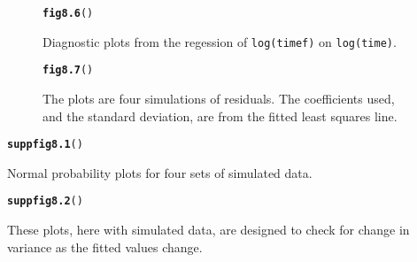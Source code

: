 \documentclass[12pt, a4paper,  BCOR=8.25mm, DIV=15]{scrartcl}\usepackage[]{graphicx}\usepackage[]{color}
\makeatletter
\newcommand{\hlstd}[1]{\textcolor[rgb]{0.345,0.345,0.345}{#1}}%
\newcommand{\hlkwd}[1]{\textcolor[rgb]{0.737,0.353,0.396}{\textbf{#1}}}%
\newenvironment{kframe}{%
 \def\at@end@of@kframe{}%
 \ifinner\ifhmode%
  \def\at@end@of@kframe{\end{minipage}}%
  \begin{minipage}{\columnwidth}%
 \fi\fi%
 \def\FrameCommand##1{\hskip\@totalleftmargin \hskip-\fboxsep
 \colorbox{shadecolor}{##1}\hskip-\fboxsep
     \hskip-\linewidth \hskip-\@totalleftmargin \hskip\columnwidth}%
 \MakeFramed {\advance\hsize-\width
   \@totalleftmargin\z@ \linewidth\hsize
   \@setminipage}}%
 {\par\unskip\endMakeFramed%
 \at@end@of@kframe}
\newenvironment{knitrout}{}{} %
\newcommand{\txtt}[1]{{\texttt{#1}}}
\makeatother
\begin{document}
\begin{figure}[H]
\begin{knitrout}
\color{fgcolor}\begin{kframe}
\begin{alltt}
\hlkwd{fig8.6}\hlstd{()}
\end{alltt}
\end{kframe}
\end{knitrout}
\caption{Diagnostic plots from the regession of \txtt{log(timef)} on
  \txtt{log(time)}.}\label{fig:diag-mftime-log}
\end{figure}

\begin{figure}[H]
\begin{knitrout}
\color{fgcolor}\begin{kframe}
\begin{alltt}
\hlkwd{fig8.7}\hlstd{()}
\end{alltt}
\end{kframe}
\end{knitrout}
\caption{The plots are four simulations of residuals.  The coefficients
  used, and the standard deviation, are from the fitted least squares
  line.\label{fig:4sim-mftimeres1}}
\end{figure}

\begin{suppfigure}[H]
\begin{knitrout}
\color{fgcolor}\begin{kframe}
\begin{alltt}
\hlkwd{suppfig8.1}\hlstd{()}
\end{alltt}
\end{kframe}
\end{knitrout}
\caption{Normal probability plots for four sets of simulated
  data.}\label{fig:mftimesimdiag2}
\end{suppfigure}

\begin{suppfigure}[H]
\begin{knitrout}
\color{fgcolor}\begin{kframe}
\begin{alltt}
\hlkwd{suppfig8.2}\hlstd{()}
\end{alltt}
\end{kframe}
\end{knitrout}
\caption{These plots, here with simulated data, are designed to
  check for change in variance as the fitted values
  change.\label{fig:mftimecheck3}}
\end{suppfigure}
\end{document}
